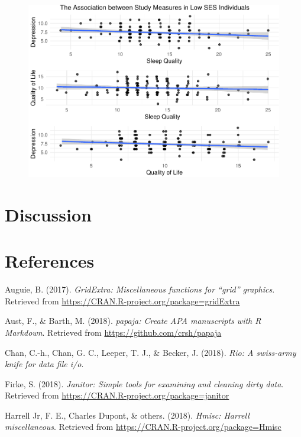 \documentclass[man]{apa6}
\begin{document}
\begin{figure}
\centering
\includegraphics{APA_Document_files/figure-latex/Figure 5-1.pdf}
\caption{}
\end{figure}

\section{Discussion}\label{discussion}

\newpage

\section{References}\label{references}

\begingroup
\setlength{\parindent}{-0.5in} \setlength{\leftskip}{0.5in}

\hypertarget{refs}{}
\hypertarget{ref-R-gridExtra}{}
Auguie, B. (2017). \emph{GridExtra: Miscellaneous functions for ``grid''
graphics}. Retrieved from
\url{https://CRAN.R-project.org/package=gridExtra}

\hypertarget{ref-R-papaja}{}
Aust, F., \& Barth, M. (2018). \emph{papaja: Create APA manuscripts with
R Markdown}. Retrieved from \url{https://github.com/crsh/papaja}

\hypertarget{ref-R-rio}{}
Chan, C.-h., Chan, G. C., Leeper, T. J., \& Becker, J. (2018).
\emph{Rio: A swiss-army knife for data file i/o}.

\hypertarget{ref-R-janitor}{}
Firke, S. (2018). \emph{Janitor: Simple tools for examining and cleaning
dirty data}. Retrieved from
\url{https://CRAN.R-project.org/package=janitor}

\hypertarget{ref-R-Hmisc}{}
Harrell Jr, F. E., Charles Dupont, \& others. (2018). \emph{Hmisc:
Harrell miscellaneous}. Retrieved from
\url{https://CRAN.R-project.org/package=Hmisc}
\end{document}
